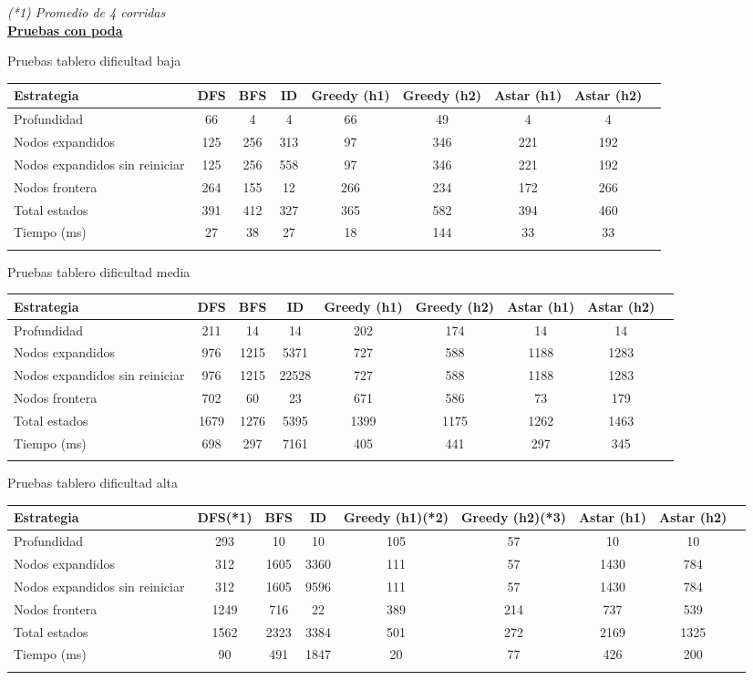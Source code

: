 \documentclass[10pt,journal,compsoc]{IEEEtran}
\begin{document}
\textit{(*1) Promedio de 4 corridas}\\

{\bf\underline{Pruebas con poda}}

Pruebas tablero dificultad baja

\begin{tabular}{l c c c c c c c c}
\hline\hline
Estrategia & DFS & BFS & ID & Greedy (h1) & Greedy (h2) & Astar (h1) & Astar (h2)\\
\hline
Profundidad	 & 66 & 4 & 4 & 66 & 49 & 4 & 4\\
Nodos expandidos  & 125 & 256 & 313 & 97 & 346 & 221& 192\\
Nodos expandidos sin reiniciar & 125 & 256 & 558 & 97 & 346 & 221& 192\\
Nodos frontera 	& 264 & 155 & 12 & 266 & 234 & 172 & 266\\
Total estados 	& 391 & 412 & 327 & 365 & 582 & 394 & 460\\
Tiempo (ms)		& 27 & 38 & 27 & 18 & 144 & 33 & 33\\
\hline\hline
\label{board1_conpoda}
\end{tabular}

Pruebas tablero dificultad media

\begin{tabular}{l c c c c c c c c}
\hline\hline
Estrategia & DFS & BFS & ID & Greedy (h1) & Greedy (h2) & Astar (h1) & Astar (h2)\\
\hline
Profundidad	 & 211 & 14 & 14 & 202 & 174 & 14 & 14\\
Nodos expandidos 	 & 976 & 1215 & 5371 & 727 & 588 & 1188 & 1283\\
Nodos expandidos sin reiniciar & 976 & 1215 & 22528 & 727 & 588 & 1188 & 1283\\
Nodos frontera 	& 702 & 60 & 23 & 671 & 586 & 73 & 179 \\
Total estados 	& 1679 & 1276 & 5395 & 1399 & 1175 & 1262 & 1463\\
Tiempo (ms)		& 698 & 297 & 7161 & 405 & 441 & 297 & 345\\
\hline\hline
\label{board2_conpoda}
\end{tabular}

Pruebas tablero dificultad alta

\begin{tabular}{l c c c c c c c c}
\hline\hline
Estrategia & DFS(*1) & BFS & ID & Greedy (h1)(*2) & Greedy (h2)(*3) & Astar (h1) & Astar (h2)\\
\hline
Profundidad	 & 293 & 10 & 10 & 105 & 57 & 10 & 10\\
Nodos expandidos 	 & 312 & 1605 & 3360 & 111 & 57 & 1430 & 784\\
Nodos expandidos sin reiniciar & 312 & 1605 & 9596 & 111 & 57 & 1430 & 784\\
Nodos frontera 	& 1249 & 716 & 22 & 389 & 214 & 737 & 539\\
Total estados 	& 1562 & 2323 & 3384 & 501 & 272 & 2169 & 1325\\
Tiempo (ms)		& 90 & 491 & 1847 & 20 & 77 & 426 & 200\\
\hline\hline
\label{board3_conpoda}
\end{tabular}
\end{document}
